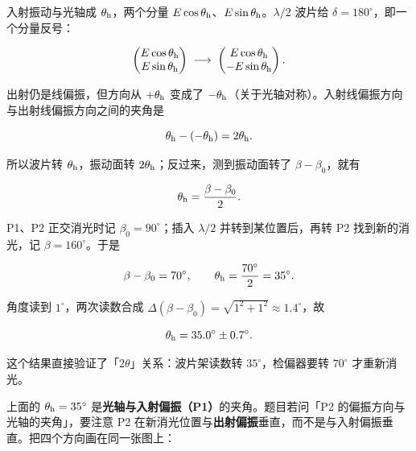 \documentclass[11pt]{ctexart}
\begin{document}


入射振动与光轴成 $\theta_{\rm h}$，两个分量 $E\cos\theta_{\rm h}$、$E\sin\theta_{\rm h}$。$\lambda/2$ 波片给 $\delta=180^\circ$，即一个分量反号：

\[
\begin{pmatrix}E\cos\theta_{\rm h}\\ E\sin\theta_{\rm h}\end{pmatrix}
\;\longrightarrow\;
\begin{pmatrix}E\cos\theta_{\rm h}\\ -E\sin\theta_{\rm h}\end{pmatrix}.
\]

出射仍是线偏振，但方向从 $+\theta_{\rm h}$ 变成了 $-\theta_{\rm h}$（关于光轴对称）。入射线偏振方向与出射线偏振方向之间的夹角是

\[
\theta_{\rm h}-(-\theta_{\rm h})=2\theta_{\rm h}.
\]

所以波片转 $\theta_{\rm h}$，振动面转 $2\theta_{\rm h}$；反过来，测到振动面转了 $\beta-\beta_0$，就有

\[
\theta_{\rm h}=\frac{\beta-\beta_0}{2}.
\]


P1、P2 正交消光时记 $\beta_0=90^\circ$；插入 $\lambda/2$ 并转到某位置后，再转 P2 找到新的消光，记 $\beta=160^\circ$。于是

\[
\beta-\beta_0=70^\circ,\qquad
\theta_{\rm h}=\frac{70^\circ}{2}=35^\circ .
\]

角度读到 $1^\circ$，两次读数合成 $\Delta(\beta-\beta_0)=\sqrt{1^2+1^2}\approx1.4^\circ$，故

\[
\theta_{\rm h}=35.0^\circ\pm0.7^\circ .
\]

这个结果直接验证了「$2\theta$」关系：波片架读数转 $35^\circ$，检偏器要转 $70^\circ$ 才重新消光。


上面的 $\theta_{\rm h}=35^\circ$ 是\textbf{光轴与入射偏振（P1）}的夹角。题目若问「P2 的偏振方向与光轴的夹角」，要注意 P2 在新消光位置与\textbf{出射偏振}垂直，而不是与入射偏振垂直。把四个方向画在同一张图上：

\begin{center}
\end{center}
\end{document}
